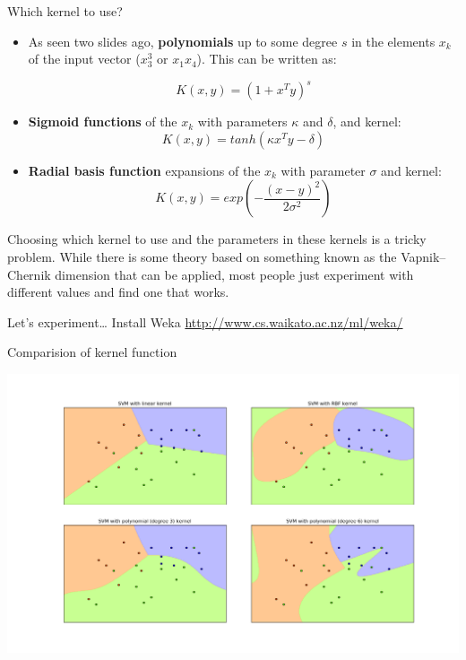 \documentclass[compress]{beamer}
\begin{document}
\begin{frame}{Which kernel to use?}

\begin{itemize}

    \item As seen two slides ago, \textbf{polynomials} up to some degree $s$ in the
  elements $x_k$ of the input vector (\eg $x^3_3$ or $x_1 x_4$). This can be written as:

    \[
        K(x, y) = (1 + x^Ty)^s
    \]

\item \textbf{Sigmoid functions} of the $x_k$ with parameters $\kappa$ and $\delta$, and
  kernel:
    \[
        K(x, y) = tanh(\kappa x^T y - \delta)
    \]
\item \textbf{Radial basis function} expansions of the $x_k$ with parameter $\sigma$
  and kernel:
    \[
        K(x, y) = exp(- \frac{(x-y)^2}{2\sigma^2})
    \]

\end{itemize}



Choosing which kernel to use and the parameters in these kernels is a
  tricky problem. While there is some theory based on something known as
  the Vapnik--Chernik dimension that can be applied, most people just
  experiment with different values and find one that works.

Let's experiment\ldots{} Install Weka
  \url{http://www.cs.waikato.ac.nz/ml/weka/}

\end{frame}

\begin{frame}{Comparision of kernel function}
    \begin{center}
        \includegraphics[width=0.8\linewidth]{svm_comparison}
    \end{center}
\end{frame}
\end{document}
